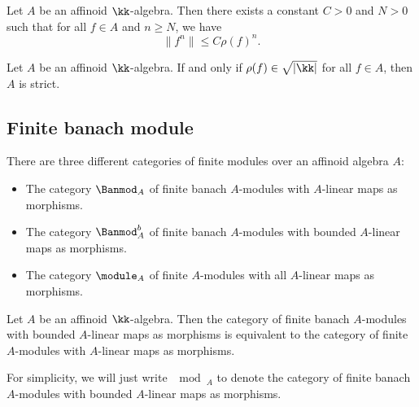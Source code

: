     \begin{proposition}\label{prop:the_norm_on_affinoid_is_bounded_by_spectral_radius}
        Let \(A\) be an affinoid \(\kk\)-algebra.
        Then there exists a constant \(C > 0\) and \(N > 0\) such that for all \(f \in A\) and \(n \geq N\), we have
        \[
            \|f^n\| \leq C \rho(f)^n.   
        \]
    \end{proposition}

    \begin{proposition}\label{prop:affinoid_algebra_is_strict_when_radius_in_the_radical_of_valuation_set}
        Let \(A\) be an affinoid \(\kk\)-algebra.
        If and only if \(\rho(f) \in \sqrt{|\kk|}\) for all \(f \in A\), then \(A\) is strict.
    \end{proposition}


\subsection{Finite banach module}

    There are three different categories of finite modules over an affinoid algebra \(A\):
    \begin{itemize}
        \item The category \(\Banmod_A\) of finite banach \(A\)-modules with \(A\)-linear maps as morphisms.
        \item The category \(\Banmod_A^b\) of finite banach \(A\)-modules with bounded \(A\)-linear maps as morphisms.
        \item The category \(\module_A\) of finite \(A\)-modules with all \(A\)-linear maps as morphisms.
    \end{itemize}

    \begin{theorem}\label{thm:equivalent_of_categroy_of_finite_banach_module_and_algebraic_module}
        Let \(A\) be an affinoid \(\kk\)-algebra.
        Then the category of finite banach \(A\)-modules with bounded \(A\)-linear maps as morphisms is equivalent to the category of finite \(A\)-modules with \(A\)-linear maps as morphisms.
    \end{theorem}

    For simplicity, we will just write \(\mod_A\) to denote the category of finite banach \(A\)-modules with bounded \(A\)-linear maps as morphisms.